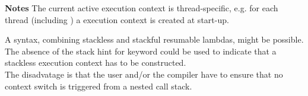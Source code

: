 {\bf Notes}
\newline
The current active execution context is thread-specific, e.g. for each thread
(including \main) a execution context is created at start-up.

A syntax, combining stackless and stackful resumable lambdas, might be possible.
The absence of the stack hint for keyword \resumable could be used to indicate
that a stackless execution context has to be constructed.\\
The disadvatage is that the user and/or the compiler have to ensure that no
context switch is triggered from a nested call stack.
